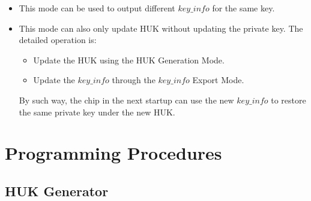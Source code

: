 \documentclass[main\_\_EN.tex]{subfiles}
\begin{document}
\vspace{-0.5em}
\begin{tiplisting}
\vspace{-2em}
\begin{itemize}
    \item This mode can be used to output different \hyperref[para:keyinfo]{\begin{math}key\_info\end{math}} for the same key.
    \item This mode can also only update HUK without updating the private key. The detailed operation is: 
    \begin{itemize}
        \item Update the HUK using the HUK Generation Mode.
        \item Update the \hyperref[para:keyinfo]{\begin{math}key\_info\end{math}} through the \hyperref[para:keyinfo]{\begin{math}key\_info\end{math}} Export Mode.
    \end{itemize}
    By such way, the chip in the next startup can use the new \hyperref[para:keyinfo]{\begin{math}key\_info\end{math}} to restore the same private key under the new HUK.
\end{itemize}
\end{tiplisting}



\section{Programming Procedures}
\label{sec:keymng-prog-procedures}

\subsection{HUK Generator}
\label{sec:huk-generate}
\end{document}
